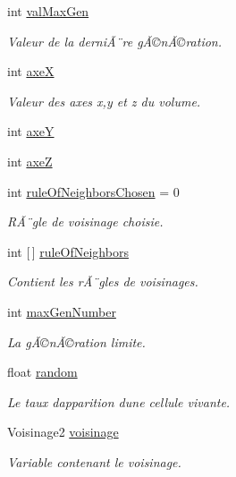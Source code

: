 \begin{DoxyCompactItemize}
int \mbox{\hyperlink{class_parameters_a169d89f0e1954fe0dd8a588db68bc5d3}{val\+Max\+Gen}}
\begin{DoxyCompactList}\small\item\em Valeur de la derniÃ¨re gÃ©nÃ©ration. \end{DoxyCompactList}\item 
int \mbox{\hyperlink{class_parameters_ad1ebedc3a59e983f8bb3f4816cbe0969}{axeX}}
\begin{DoxyCompactList}\small\item\em Valeur des axes x,y et z du volume. \end{DoxyCompactList}\item 
int \mbox{\hyperlink{class_parameters_a30e0f9fdc5cff2253f40ab0206f1b748}{axeY}}
\item 
int \mbox{\hyperlink{class_parameters_a0259b6b9e73302fb43a80b6756422596}{axeZ}}
\item 
int \mbox{\hyperlink{class_parameters_ae93c8919d298fca6d55246e5f2d68f64}{rule\+Of\+Neighbors\+Chosen}} = 0
\begin{DoxyCompactList}\small\item\em RÃ¨gle de voisinage choisie. \end{DoxyCompactList}\item 
int \mbox{[}$\,$\mbox{]} \mbox{\hyperlink{class_parameters_a9900b1e54888301a55408bf4308a6017}{rule\+Of\+Neighbors}}
\begin{DoxyCompactList}\small\item\em Contient les rÃ¨gles de voisinages. \end{DoxyCompactList}\item 
int \mbox{\hyperlink{class_parameters_ab2aae264b2829322043e1b23394bc996}{max\+Gen\+Number}}
\begin{DoxyCompactList}\small\item\em La gÃ©nÃ©ration limite. \end{DoxyCompactList}\item 
float \mbox{\hyperlink{class_parameters_a35b50b196bd5e9bfde42d8cc69642bfb}{random}}
\begin{DoxyCompactList}\small\item\em Le taux d\textquotesingle{}apparition d\textquotesingle{}une cellule vivante. \end{DoxyCompactList}\item 
Voisinage2 \mbox{\hyperlink{class_parameters_ad6693ced27cf9d3ebe6d35400ee1bdd5}{voisinage}}
\begin{DoxyCompactList}\small\item\em Variable contenant le voisinage. \end{DoxyCompactList}\item 

\end{DoxyCompactItemize}
